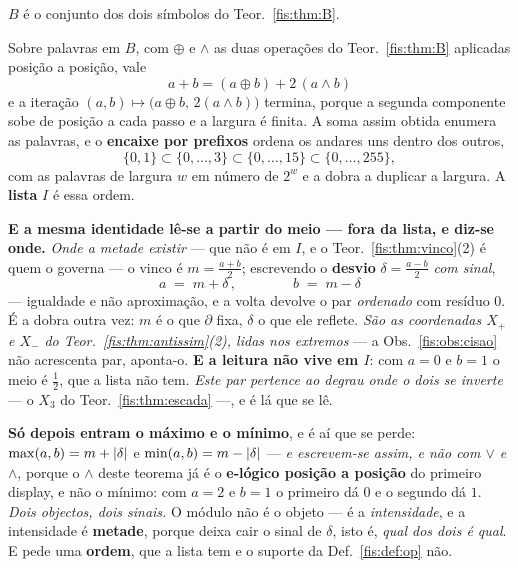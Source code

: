 \documentclass[livro.tex]{subfiles}
\begin{document}
\begin{definicao}[o binário]\label{fis:def:B}
$B$ é o conjunto dos dois símbolos do Teor.~\ref{fis:thm:B}.
\end{definicao}


\begin{teorema}\label{fis:thm:BI}
Sobre palavras em $B$, com $\oplus$ e $\wedge$ as duas operações do
Teor.~\ref{fis:thm:B} aplicadas posição a posição, vale
\[
\boxed{\;a+b=(a\oplus b)+2\,(a\wedge b)\;}
\]
e a iteração $(a,b)\mapsto\bigl(a\oplus b,\,2(a\wedge b)\bigr)$ termina, porque a
segunda componente sobe de posição a cada passo e a largura é finita. A soma
assim obtida enumera as palavras, e o \textbf{encaixe por prefixos} ordena os
andares uns dentro dos outros,
\[
\{0,1\}\subset\{0,\dots,3\}\subset\{0,\dots,15\}\subset\{0,\dots,255\},
\]
com as palavras de largura $w$ em número de $2^{w}$ e a dobra a duplicar a
largura. A \textbf{lista} $I$ é essa ordem.

\medskip\noindent\textbf{E a mesma identidade lê-se a partir do meio --- fora da
lista, e diz-se onde.} \emph{Onde a metade existir} --- que não é em $I$, e o
Teor.~\ref{fis:thm:vinco}(2) é quem o governa --- o vinco é
$m=\tfrac{a+b}{2}$; escrevendo o \textbf{desvio} $\delta=\tfrac{a-b}{2}$
\emph{com sinal},
\[
\boxed{\;a \;=\; m+\delta\,,\qquad\qquad b \;=\; m-\delta\;}
\]
--- igualdade e não aproximação, e a volta devolve o par \emph{ordenado} com
resíduo $0$. É a dobra outra vez: $m$ é o que $\partial$ fixa, $\delta$ o que ele
reflete. \emph{São as coordenadas $X_{+}$ e $X_{-}$ do Teor.~\ref{fis:thm:antissim}(2),
lidas nos extremos} --- a Obs.~\ref{fis:obs:cisao} não acrescenta par, aponta-o.
\textbf{E a leitura não vive em $I$}: com $a=0$ e $b=1$ o meio é
$\tfrac12$, que a lista não tem. \emph{Este par pertence ao degrau onde o dois se
inverte} --- o $X_3$ do Teor.~\ref{fis:thm:escada} ---, e é lá que se lê.

\medskip\noindent\textbf{Só depois entram o máximo e o mínimo}, e é aí que se
perde: $\max(a,b)=m+\lvert \delta\rvert$ e $\min(a,b)=m-\lvert \delta\rvert$ --- \emph{e
escrevem-se assim, e não com $\vee$ e $\wedge$}, porque o $\wedge$ deste teorema
já é o \textbf{e-lógico posição a posição} do primeiro display, e não o mínimo:
com $a=2$ e $b=1$ o primeiro dá $0$ e o segundo dá $1$. \emph{Dois objectos, dois
sinais.} O módulo não é o objeto --- é a \emph{intensidade}, e a intensidade é
\textbf{metade}, porque deixa cair o sinal de $\delta$, isto é, \emph{qual dos
dois é qual}. E pede uma \textbf{ordem}, que a lista tem e o suporte da
Def.~\ref{fis:def:op} não.


\end{teorema}
\end{document}
